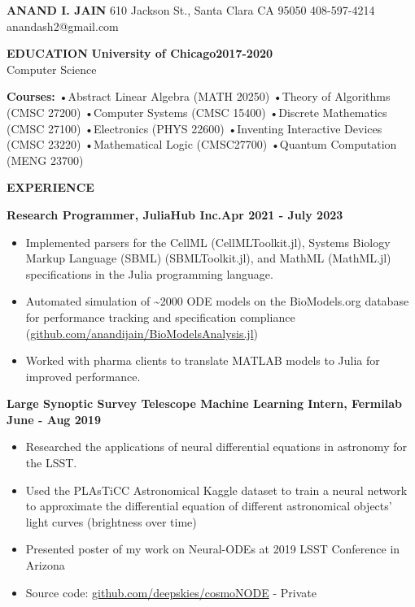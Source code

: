 \documentclass[10pt]{extarticle}
\begin{document}
\hspace{0.145in} {\huge\bf ANAND I. JAIN} \hspace{0.4cm} 610 Jackson St., Santa Clara CA 95050 \hspace{0.1cm} 408-597-4214 \hfill anandash2@gmail.com

\begin{list}{}{\setlength{\leftmargin}{1.4in}\setlength{\labelsep}{0.1cm}\setlength{\labelwidth}{1.18in}}
\item[{\bf EDUCATION}\hfill]
{\bf University of Chicago}\hfill {\bf 2017-2020}\\
Computer Science

{\bf Courses:}
•Abstract Linear Algebra (MATH 20250) •Theory of Algorithms (CMSC 27200) •Computer Systems (CMSC 15400) •Discrete Mathematics (CMSC 27100)
•Electronics (PHYS 22600) •Inventing Interactive Devices (CMSC 23220) •Mathematical Logic (CMSC27700) •Quantum Computation (MENG 23700)

\item[\bf EXPERIENCE\hfill] 

{\bf Research Programmer, JuliaHub Inc.}\hfill {\bf Apr 2021 - July 2023}
  \begin{itemize}[noitemsep]
    \item Implemented parsers for the CellML (CellMLToolkit.jl), Systems Biology Markup Language (SBML) (SBMLToolkit.jl), and MathML (MathML.jl) specifications in the Julia programming language. 
    \item Automated simulation of \textasciitilde2000 ODE models on the BioModels.org database for performance tracking and specification compliance (\url{github.com/anandijain/BioModelsAnalysis.jl})
    \item Worked with pharma clients to translate MATLAB models to Julia for improved performance.
  \end{itemize}

{\bf Large Synoptic Survey Telescope Machine Learning Intern, Fermilab} \hfill {\bf June - Aug 2019}
  \begin{itemize}[noitemsep]
    \item Researched the applications of neural differential equations in astronomy for the LSST.
    \item Used the PLAsTiCC Astronomical Kaggle dataset to train a neural network to approximate
    the differential equation of different astronomical objects’ light curves (brightness over time)
    \item Presented poster of my work on Neural-ODEs at 2019 LSST Conference in Arizona
    \item Source code:  \url{github.com/deepskies/cosmoNODE} - Private
  \end{itemize}



\end{list}
\end{document}
